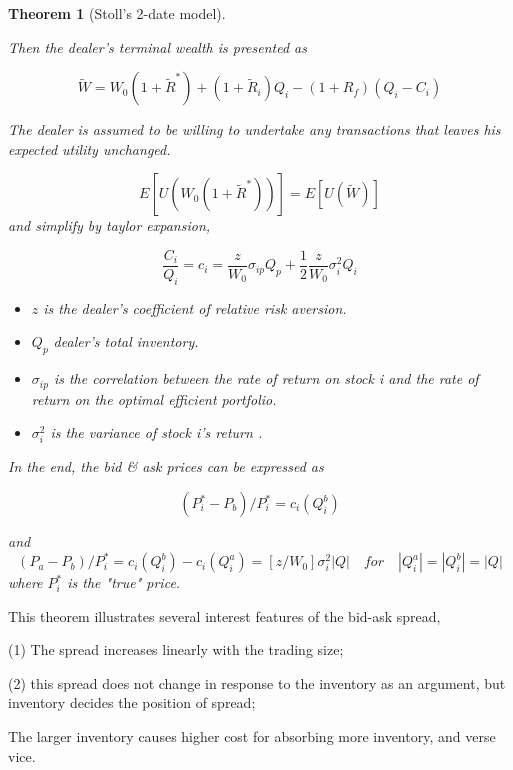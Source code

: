 \documentclass[a4]{article}
\newtheorem{theorem}{Theorem}
\begin{document}
\begin{theorem}[Stoll's 2-date model]
\begin{itemize}
\end{itemize}
Then the dealer's terminal wealth is presented as\par 
\begin{equation}
\tilde{W} = W_{0}(1+\tilde{R}^{*}) + (1+\tilde{R}_{i})Q_{i} - (1+R_{f})(Q_{i}-C_{i})
\end{equation}\par 
The dealer is assumed to be willing to undertake any transactions that leaves his expected utility unchanged.\par 
\begin{equation}
E[U(W_{0}(1+\tilde{R}^{*}))] = E[U(\tilde{W})]
\end{equation}
and simplify by taylor expansion,\par 
\begin{equation}
\frac{C_{i}}{Q_{i}} = c_{i}= \frac{z}{W_{0}}\sigma_{ip}Q_{p} + \frac{1}{2}\frac{z}{W_{0}}\sigma_{i}^{2}Q_{i}
\end{equation}
\begin{itemize}
	\item $z$ is the dealer's coefficient of relative risk aversion.
	\item $Q_{p}$ dealer's total inventory.
	\item $\sigma_{ip}$ is the correlation between the rate of return on stock i and the rate of return on the optimal efficient portfolio.
	\item $\sigma_{i}^{2}$ is the variance of stock i's return .
\end{itemize}\par 
\bigbreak 
In the end, the bid \& ask prices can be expressed as \par 
\begin{equation}
(P^{*}_{i}-P_{b})/P^{*}_{i} = c_{i}(Q_{i}^{b})
\end{equation}\par 
and 
\begin{equation}
(P_{a}-P_{b})/P_{i}^{*} = c_{i}(Q_{i}^{b}) - c_{i}(Q_{i}^{a}) = [z/W_{0}]\sigma_{i}^{2}|Q| \quad for \quad |Q_{i}^{a}| = |Q_{i}^{b}| = |Q|
\end{equation}
where $P_{i}^{*}$ is the "true" price.
\end{theorem}\par 
\noindent This theorem illustrates several interest features of the bid-ask spread, \par 
(1) The spread increases linearly with the trading size; \par 
(2) this spread does not change in response to the inventory as an argument, but inventory decides the position of spread; \par \bigbreak 
\noindent The larger inventory causes higher cost for absorbing more inventory, and verse vice.\par 
\end{document}
